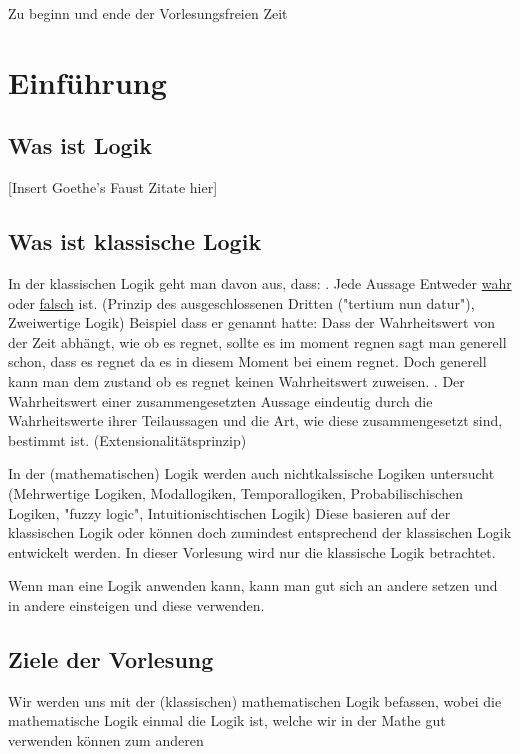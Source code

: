 \documentclass[12pt,a4paper]{article} %
\begin{document}
Zu beginn und ende der Vorlesungsfreien Zeit

\section{Einführung}

\subsection{Was ist Logik}
[Insert Goethe's Faust Zitate hier]  \newline

\subsection{Was ist klassische Logik}

In der klassischen Logik geht man davon aus, dass: . Jede Aussage Entweder \underline{wahr} oder \underline{falsch} ist. (Prinzip des ausgeschlossenen Dritten ("tertium nun datur"), Zweiwertige Logik) \newline
Beispiel dass er genannt hatte: Dass der Wahrheitswert von der Zeit abhängt, wie ob es regnet, sollte es im moment regnen sagt man generell schon, dass es regnet da es in diesem Moment bei einem regnet. Doch generell kann man dem zustand ob es regnet keinen Wahrheitswert zuweisen. . Der Wahrheitswert einer zusammengesetzten Aussage eindeutig durch die Wahrheitswerte ihrer Teilaussagen und die Art, wie diese zusammengesetzt sind, bestimmt ist. (Extensionalitätsprinzip)\newline

In der (mathematischen) Logik werden auch nichtkalssische Logiken untersucht (Mehrwertige Logiken, Modallogiken, Temporallogiken, Probabilischischen Logiken, "fuzzy logic", Intuitionischtischen Logik) Diese basieren auf der klassischen Logik oder können doch zumindest entsprechend der klassischen Logik entwickelt werden. \newline
In dieser Vorlesung wird nur die klassische Logik betrachtet.

Wenn man eine Logik anwenden kann, kann man gut sich an andere setzen und in andere einsteigen und diese verwenden.

\subsection{Ziele der Vorlesung}
Wir werden uns mit der (klassischen) mathematischen Logik befassen, wobei die mathematische Logik einmal die Logik ist, welche wir in der Mathe gut verwenden können zum anderen 
\end{document}
